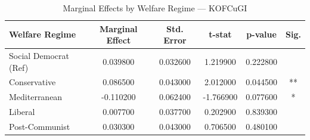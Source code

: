 \begin{table}[htbp]
\caption{Marginal Effects by Welfare Regime — KOFCuGI}
\label{tab:marginal_effects_KOFCuGI}
\begin{tabular}{lccccc}
\toprule
Welfare Regime & Marginal Effect & Std. Error & t-stat & p-value & Sig. \\
\midrule
Social Democrat (Ref) & 0.039800 & 0.032600 & 1.219900 & 0.222800 &  \\
Conservative & 0.086500 & 0.043000 & 2.012000 & 0.044500 & ** \\
Mediterranean & -0.110200 & 0.062400 & -1.766900 & 0.077600 & * \\
Liberal & 0.007700 & 0.037700 & 0.202900 & 0.839300 &  \\
Post-Communist & 0.030300 & 0.043000 & 0.706500 & 0.480100 &  \\
\bottomrule
\end{tabular}
\end{table}
